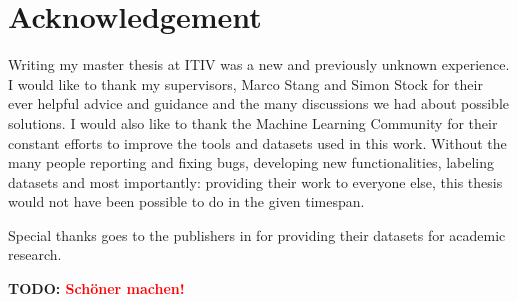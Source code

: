 \documentclass[12pt,a4paper,twoside]{report}
\newcommand{\mypar}{\par\medskip}
\newcommand{\writeTodo}{1}
\newcommand{\todo}[1]{
	\ifdefined \writeTodo
		\mypar\textbf{\textcolor{KITgreen}{TODO: }\textcolor{red}{#1}}\mypar
	\fi
}
\theoremstyle{definition}
\begin{document}
\nocite{Tompson2014, Yuan2017, Sun2015, Yuan2017b, GarciaHernando2017, Yuan2017c}

%


		
		\cleardoublepage
    \appendix

%    
		\cleardoublepage

    \listoftables
    	\cleardoublepage
    \listoffigures
    	\cleardoublepage
    \printindex
    	\cleardoublepage
    \printnomenclature
    \renewcommand{\leftmark}{\uppercase{Abkürzungsverzeichnis}}
    	\cleardoublepage

    \section{Acknowledgement}
    Writing my master thesis at ITIV was a new and previously unknown experience. 
    I would like to thank my supervisors, Marco Stang and Simon Stock for their ever helpful advice and guidance and the many discussions we had about possible solutions.
    I would also like to thank the Machine Learning Community for their constant efforts to improve the tools and datasets used in this work. Without the many people reporting and fixing bugs, developing new functionalities, labeling datasets and most importantly: providing their work to everyone else, this thesis would not have been possible to do in the given timespan.
    
    Special thanks goes to the publishers in \cite{Tompson2014, Yuan2017, Sun2015, Yuan2017b, GarciaHernando2017, Yuan2017c} for providing their datasets for academic research.

\todo{Schöner machen!}
\end{document}
